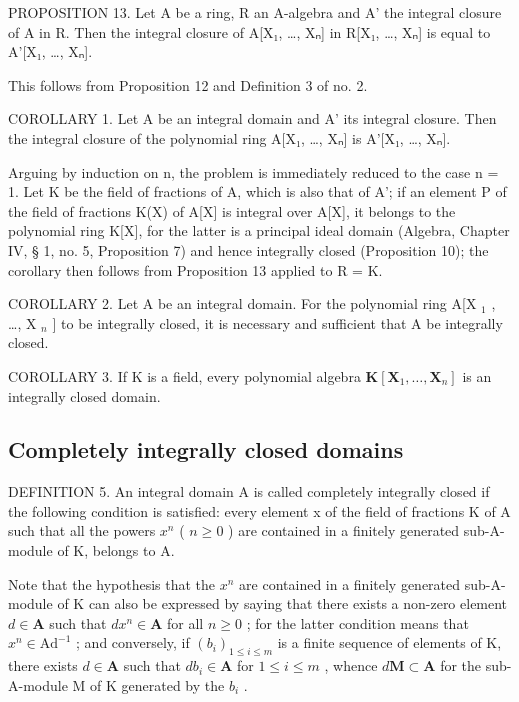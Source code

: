 PROPOSITION 13. Let A be a ring, R an A-algebra and A' the integral closure of A in R. Then the integral closure of A{[}X₁, \ldots, Xₙ{]} in R{[}X₁, \ldots, Xₙ{]} is equal to A'{[}X₁, \ldots, Xₙ{]}.

This follows from Proposition 12 and Definition 3 of no. 2.

COROLLARY 1. Let A be an integral domain and A' its integral closure. Then the integral closure of the polynomial ring A{[}X₁, \ldots, Xₙ{]} is A'{[}X₁, \ldots, Xₙ{]}.

Arguing by induction on n, the problem is immediately reduced to the case n = 1. Let K be the field of fractions of A, which is also that of A'; if an element P of the field of fractions K(X) of A{[}X{]} is integral over A{[}X{]}, it belongs to the polynomial ring K{[}X{]}, for the latter is a principal ideal domain (Algebra, Chapter IV, § 1, no. 5, Proposition 7) and hence integrally closed (Proposition 10); the corollary then follows from Proposition 13 applied to R = K.

COROLLARY 2. Let A be an integral domain. For the polynomial ring A{[}X \(_{1}\) , \ldots, X \(_{n}\) {]} to be integrally closed, it is necessary and sufficient that A be integrally closed.

COROLLARY 3. If K is a field, every polynomial algebra \(\mathbf{K}[\mathbf{X}_1,\ldots ,\mathbf{X}_n]\) is an integrally closed domain.

\subsection{Completely integrally closed domains}

DEFINITION 5. An integral domain A is called completely integrally closed if the following condition is satisfied: every element x of the field of fractions K of A such that all the powers \(x^{n}\) ( \(n \geqslant 0\) ) are contained in a finitely generated sub-A-module of K, belongs to A.

Note that the hypothesis that the \(x^n\) are contained in a finitely generated sub-A-module of K can also be expressed by saying that there exists a non-zero element \(d \in \mathbf{A}\) such that \(dx^n \in \mathbf{A}\) for all \(n \geqslant 0\) ; for the latter condition means that \(x^n \in \mathrm{Ad}^{-1}\) ; and conversely, if \((b_i)_{1 \leqslant i \leqslant m}\) is a finite sequence of elements of K, there exists \(d \in \mathbf{A}\) such that \(db_i \in \mathbf{A}\) for \(1 \leqslant i \leqslant m\) , whence \(d\mathbf{M} \subset \mathbf{A}\) for the sub-A-module M of K generated by the \(b_i\) .


